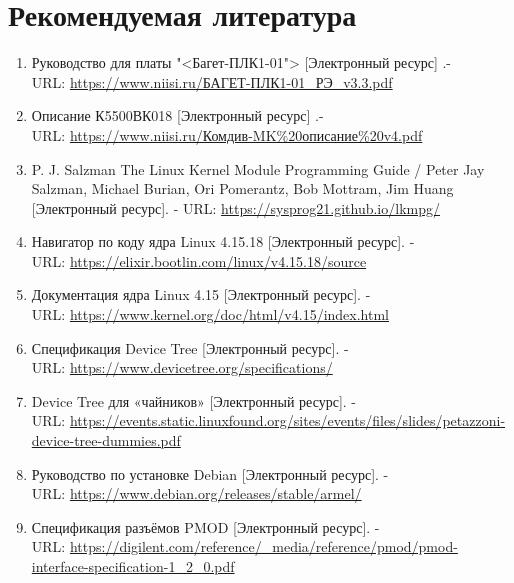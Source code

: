 \chapter*{Рекомендуемая литература}

\begin{enumerate}
	\item Руководство для платы "<Багет-ПЛК1-01"> [Электронный ресурс] .- \\
	URL: \href{https://www.niisi.ru/%D0%91%D0%90%D0%93%D0%95%D0%A2-%D0%9F%D0%9B%D0%9A1-01_%D0%A0%D0%AD_v3.3.pdf}{https://www.niisi.ru/БАГЕТ-ПЛК1-01\_РЭ\_v3.3.pdf}
	
	\item Описание К5500ВК018 [Электронный ресурс] .- \\
	URL: \href{https://www.niisi.ru/%D0%9A%D0%BE%D0%BC%D0%B4%D0%B8%D0%B2-%D0%9C%D0%9A%20%D0%BE%D0%BF%D0%B8%D1%81%D0%B0%D0%BD%D0%B8%D0%B5%20v4.pdf}{https://www.niisi.ru/Комдив-MK\%20описание\%20v4.pdf}
	
	\item P. J. Salzman The Linux Kernel Module Programming Guide / Peter Jay Salzman, Michael Burian, Ori Pomerantz, Bob Mottram, Jim Huang [Электронный ресурс]. - URL: \href {https://sysprog21.github.io/lkmpg/}{https://sysprog21.github.io/lkmpg/}
	
	\item Навигатор по коду ядра Linux 4.15.18 [Электронный ресурс]. - \\
	URL: \href{https://elixir.bootlin.com/linux/v4.15.18/source}{https://elixir.bootlin.com/linux/v4.15.18/source}
	
	\item Документация ядра Linux 4.15 [Электронный ресурс]. - \\ 
	URL: \href{https://www.kernel.org/doc/html/v4.15/index.html}{https://www.kernel.org/doc/html/v4.15/index.html}
	
	\item  Спецификация Device Tree [Электронный ресурс]. - \\
	URL: \href{https://www.devicetree.org/specifications/}{https://www.devicetree.org/specifications/}
	
	\item Device Tree для «чайников» [Электронный ресурс]. - \\
	URL: \href{https://events.static.linuxfound.org/sites/events/files/slides/petazzoni-device-tree-dummies.pdf}{https://events.static.linuxfound.org/sites/events/files/slides/petazzoni-device-tree-dummies.pdf}
	
	\item  Руководство по установке Debian [Электронный ресурс]. - \\
	URL: \href{https://www.debian.org/releases/stable/armel/}{https://www.debian.org/releases/stable/armel/}
	
	\item  Спецификация разъёмов PMOD [Электронный ресурс]. - \\
	URL: \href{https://digilent.com/reference/\_media/reference/pmod/pmod-interface-specification-1\_2\_0.pdf}{https://digilent.com/reference/\_media/reference/pmod/pmod-interface-specification-1\_2\_0.pdf}
\end{enumerate}